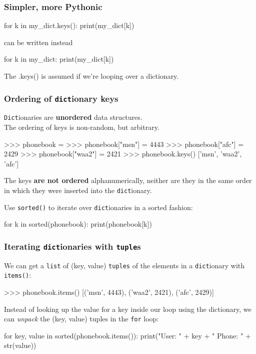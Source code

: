 \documentclass{beamer}
\begin{document}
\begin{frame}[fragile]
\frametitle{Simpler, more Pythonic}
\begin{code}
for k in my_dict.keys():
   print(my_dict[k])
\end{code}
can be written instead
\begin{code}
for k in my_dict:
   print(my_dict[k])
\end{code}
The .keys() is assumed if we're looping over a dictionary.
\end{frame}


\begin{frame}[fragile]
\frametitle{Ordering of \texttt{dict}ionary keys}
\texttt{Dict}ionaries are \textbf{unordered} data structures.\\
The ordering of keys is non-random, but arbitrary.
\begin{code}
>>> phonebook = {}
>>> phonebook["msn"] = 4443
>>> phonebook["afc"] = 2429
>>> phonebook["waa2"] = 2421 
>>> phonebook.keys()
['msn', 'waa2', 'afc']
\end{code}
The keys \textbf{are not ordered} alphanumerically, neither are they in the same
order in which they were inserted into the \texttt{dict}ionary.
\vskip 0.3cm

Use \texttt{sorted()} to iterate over \texttt{dict}ionaries in a sorted fashion:
\begin{code}
for k in sorted(phonebook):
   print(phonebook[k])
\end{code}
\end{frame}


\begin{frame}[fragile]
\frametitle{Iterating \texttt{dict}ionaries with \texttt{tuple}s}
We can get a \texttt{list} of (key, value) \texttt{tuples} of the elements
in a \texttt{dict}ionary with \texttt{items()}:
\begin{code}
>>> phonebook.items()
[('msn', 4443), ('waa2', 2421), ('afc', 2429)]
\end{code}

\vskip 0.3cm
Instead of looking up the value for a key inside our loop using the dictionary,
we can \textit{unpack} the (key, value) tuples in the \texttt{for} loop:
\begin{code}
for key, value in sorted(phonebook.items()):
    print("User: " + key + " Phone: " + str(value))
\end{code}
\end{frame}
\end{document}
